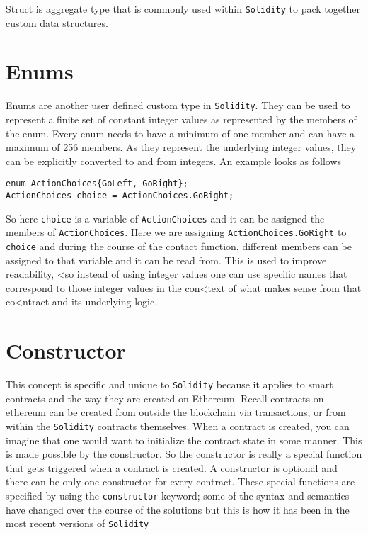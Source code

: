 Struct is aggregate type that is commonly used within \texttt{Solidity} to pack together custom data structures.

\section{Enums}
Enums are another user defined custom type in \texttt{Solidity}. They can be used to represent a finite set of constant integer values as represented by the members of the enum. Every enum needs to have a minimum of one member and can have a maximum of 256 members. As they represent the underlying integer values, they can be explicitly converted to and from integers. An example looks as follows

\begin{lstlisting}[language=Solidity, style=solStyle, caption={Example of enums}]
enum ActionChoices{GoLeft, GoRight};
ActionChoices choice = ActionChoices.GoRight;
\end{lstlisting}

So here \texttt{choice} is a variable of \texttt{ActionChoices} and it can be assigned the members of \texttt{ActionChoices}. Here we are assigning \texttt{ActionChoices.GoRight} to \texttt{choice} and during the course of the contact function, different members can be assigned to that variable and it can be read from. This is used to improve readability, <so instead of using integer values one can use specific names that correspond to those integer values in the con<text of what makes sense from that co<ntract and its underlying logic.

\section{Constructor}
This concept is specific and unique to \texttt{Solidity} because it applies to smart contracts and the way they are created on Ethereum. Recall contracts on ethereum can be created from outside the blockchain via transactions, or from within the \texttt{Solidity} contracts themselves. When a contract is created, you can imagine that one would want to initialize the contract state in some manner. This is made possible by the constructor. So the constructor is really a special function that gets triggered when a contract is created. A constructor is optional and there can be only one constructor for every contract. These special functions are specified by using the \texttt{constructor} keyword; some of the syntax and semantics have changed over the course of the solutions but this is how it has been in the most recent versions of \texttt{Solidity}

